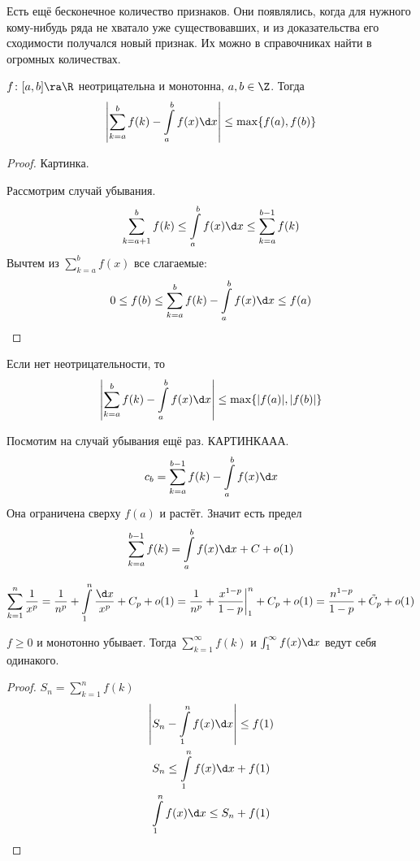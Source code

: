 Есть ещё бесконечное количество признаков.
Они появлялись, когда для нужного кому-нибудь ряда не хватало уже существовавших, и из доказательства его сходимости получался новый признак.
Их можно в справочниках найти в огромных количествах.

\begin{theorem}
	$f\colon [a, b] \ra \R$ неотрицательна и монотонна, $a, b \in \Z$.
	Тогда
	\[ \left| \sum_{k=a}^b f(k) - \int\limits_a^b f(x) \d x\right| \le \max \{f(a), f(b)\} \]
\end{theorem}
\begin{proof}
	\TODO Картинка.

	Рассмотрим случай убывания.
	\[ \sum_{k=a+1}^b f(k) \le \int\limits_a^b f(x) \d x \le \sum_{k=a}^{b-1} f(k) \]
	Вычтем из $\sum_{k=a}^b f(x)$ все слагаемые:
	\[ 0 \le f(b) \le \sum_{k=a}^b f(k) - \int\limits_a^b f(x) \d x \le f(a) \]
\end{proof}
\begin{Rem}
	Если нет неотрицательности, то
	\[ \left| \sum_{k=a}^b f(k) - \int\limits_a^b f(x) \d x\right| \le \max \{|f(a)|, |f(b)|\} \]
\end{Rem}
\begin{Rem}
	Посмотим на случай убывания ещё раз.
	КАРТИНКААА.
	\[ c_b = \sum_{k=a}^{b-1} f(k) - \int\limits_a^b f(x) \d x\]
	Она ограничена сверху $f(a)$ и растёт.
	Значит есть предел
	\[ \sum_{k=a}^{b-1} f(k) = \int\limits_a^b f(x) \d x + C + o(1) \]
\end{Rem}

\begin{exmp}
	\[
		\sum_{k=1}^n \frac1{x^p}
		= \frac1{n^p} + \int\limits_1^n \frac{\d x}{x^p} + C_p + o(1)
		= \frac1{n^p} + \frac{x^{1-p}}{1-p} \biggr|_1^n + C_p + o(1)
		= \frac{n^{1-p}}{1-p} + \tilde C_p + o(1)
	\]
\end{exmp}

\begin{theorem}
	$f \ge 0$ и монотонно убывает.
	Тогда $\sum_{k=1}^\infty f(k)$ и $\int_1^\infty f(x) \d x$ ведут себя одинакого.
\end{theorem}
\begin{proof}
	$S_n = \sum_{k=1}^n f(k)$
	\begin{gather*}
		\left|S_n - \int\limits_1^n f(x) \d x\right| \le f(1) \\
		S_n \le \int\limits_1^n f(x) \d x + f(1) \\
		\int\limits_1^n f(x) \d x \le S_n + f(1)
	\end{gather*}
\end{proof}
